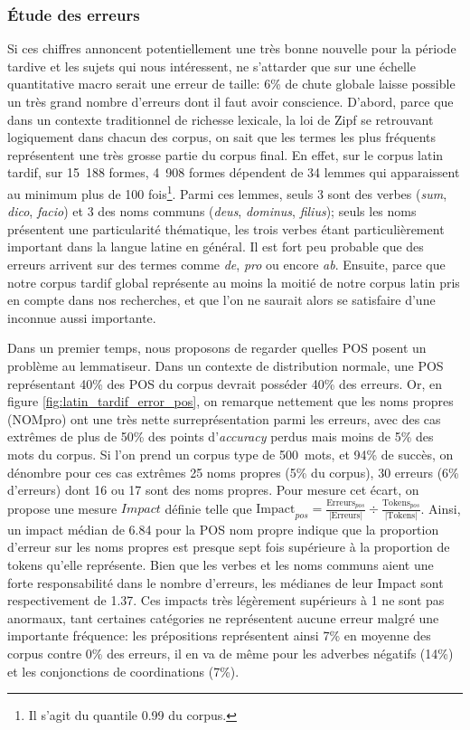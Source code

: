 \subsubsection{Étude des erreurs}

Si ces chiffres annoncent potentiellement une très bonne nouvelle pour la période tardive et les sujets qui nous intéressent, ne s'attarder que sur une échelle quantitative macro serait une erreur de taille: 6\% de chute globale laisse possible un très grand nombre d'erreurs dont il faut avoir conscience. D'abord, parce que dans un contexte traditionnel de richesse lexicale, la loi de Zipf se retrouvant logiquement dans chacun des corpus, on sait que les termes les plus fréquents représentent une très grosse partie du corpus final. En effet, sur le corpus latin tardif, sur 15~188 formes, 4~908 formes dépendent de 34 lemmes qui apparaissent au minimum plus de 100 fois\footnote{Il s'agit du quantile 0.99 du corpus.}. Parmi ces lemmes, seuls 3 sont des verbes (\textit{sum}, \textit{dico}, \textit{facio}) et 3 des noms communs (\textit{deus}, \textit{dominus}, \textit{filius}); seuls les noms présentent une particularité thématique, les trois verbes étant particulièrement important dans la langue latine en général. Il est fort peu probable que des erreurs arrivent sur des termes comme \textit{de}, \textit{pro} ou encore \textit{ab}. Ensuite, parce que notre corpus tardif global représente au moins la moitié de notre corpus latin pris en compte dans nos recherches, et que l'on ne saurait alors se satisfaire d'une inconnue aussi importante.

Dans un premier temps, nous proposons de regarder quelles POS posent un problème au lemmatiseur. Dans un contexte de distribution normale, une POS représentant 40\% des POS du corpus devrait posséder 40\% des erreurs. Or, en figure \ref{fig:latin_tardif_error_pos}, on remarque nettement que les noms propres (NOMpro) ont une très nette surreprésentation parmi les erreurs, avec des cas extrêmes de plus de 50\% des points d'\textit{accuracy} perdus mais moins de 5\% des mots du corpus. Si l'on prend un corpus type de 500~mots, et 94\% de succès, on dénombre pour ces cas extrêmes 25 noms propres (5\% du corpus), 30 erreurs (6\% d'erreurs) dont 16 ou 17 sont des noms propres. Pour mesure cet écart, on propose une mesure $Impact$ définie telle que $\text{Impact}_{pos} = \frac{\text{Erreurs}_{pos}}{\left | \text{Erreurs} \right |} \div \frac{\text{Tokens}_{pos}}{\left | \text{Tokens} \right |}$. Ainsi, un impact médian de 6.84 pour la POS nom propre indique que la proportion d'erreur sur les noms propres est presque sept fois supérieure à la proportion de tokens qu'elle représente. Bien que les verbes et les noms communs aient une forte responsabilité dans le nombre d'erreurs, les médianes de leur Impact sont respectivement de 1.37. Ces impacts très légèrement supérieurs à 1 ne sont pas anormaux, tant certaines catégories ne représentent aucune erreur malgré une importante fréquence: les prépositions représentent ainsi  7\% en moyenne des corpus contre 0\% des erreurs, il en va de même pour les adverbes négatifs (14\%) et les conjonctions de coordinations (7\%).

